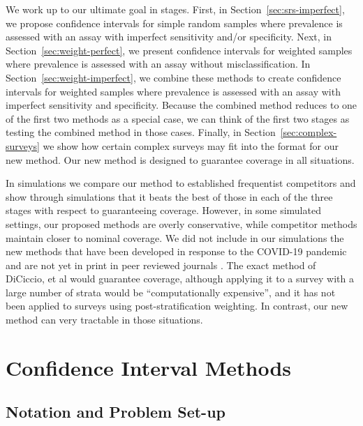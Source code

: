 \documentclass[AMA,STIX1COL]{WileyNJD-v2}
\begin{document}
We work up to our ultimate goal in stages.
First, in Section~\ref{sec:srs-imperfect}, we propose confidence intervals for simple random samples where prevalence is assessed with an assay with imperfect sensitivity and/or specificity.
Next, in Section~\ref{sec:weight-perfect}, we present confidence intervals for weighted samples where prevalence is assessed with an assay without misclassification.
In Section~\ref{sec:weight-imperfect}, we combine these methods to create confidence intervals for weighted samples where prevalence is assessed with an assay with imperfect sensitivity and specificity.
Because the combined method reduces to one of the first two methods as a special case, we can think of the first two stages as testing the combined method in those cases.  Finally, in Section~\ref{sec:complex-surveys} we show how certain complex surveys may fit into the format for our new method.
Our new method is designed to guarantee coverage in all situations. 

In simulations we compare our method to established frequentist competitors and  show through simulations that it beats the best of those in each of the three stages with respect to guaranteeing coverage.
However, in some simulated settings, our proposed methods are overly conservative, while competitor methods maintain closer to nominal coverage.
We did not include in our simulations the new methods that have been developed in response to the COVID-19 pandemic and are not yet in print in peer reviewed journals \cite{Cai:2020,DiCi:2021,rosin2021estimating}.
The exact method of DiCiccio, et al \cite{DiCi:2021} would guarantee coverage, although applying it to a survey with a large number of strata would be ``computationally expensive'', and it has not been applied to surveys using post-stratification weighting. In contrast, our new method can very tractable in those situations.   


\section{Confidence Interval Methods}

\subsection{Notation and Problem Set-up}
\label{sec-notation}
\end{document}
